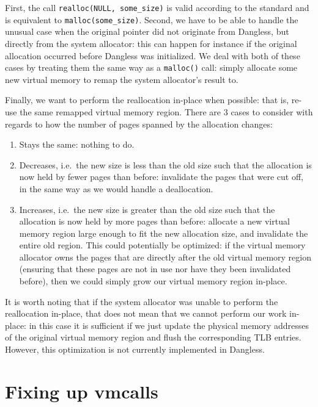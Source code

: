 First, the call \lstinline!realloc(NULL, some_size)! is valid according to the standard and is equivalent to \lstinline!malloc(some_size)!. Second, we have to be able to handle the unusual case when the original pointer did not originate from Dangless, but directly from the system allocator: this can happen for instance if the original allocation occurred before Dangless was initialized. We deal with both of these cases by treating them the same way as a \lstinline!malloc()! call: simply allocate some new virtual memory to remap the system allocator's result to.

Finally, we want to perform the reallocation in-place when possible: that is, re-use the same remapped virtual memory region. There are 3 cases to consider with regards to how the number of pages spanned by the allocation changes:

\begin{enumerate}
	\item Stays the same: nothing to do.
	\item Decreases, i.e.\ the new size is less than the old size such that the allocation is now held by fewer pages than before: invalidate the pages that were cut off, in the same way as we would handle a deallocation.
	\item Increases, i.e.\ the new size is greater than the old size such that the allocation is now held by more pages than before: allocate a new virtual memory region large enough to fit the new allocation size, and invalidate the entire old region. This could potentially be optimized: if the virtual memory allocator owns the pages that are directly after the old virtual memory region (ensuring that these pages are not in use nor have they been invalidated before), then we could simply grow our virtual memory region in-place.
\end{enumerate}

It is worth noting that if the system allocator was unable to perform the reallocation in-place, that does not mean that we cannot perform our work in-place: in this case it is sufficient if we just update the physical memory addresses of the original virtual memory region and flush the corresponding TLB entries. However, this optimization is not currently implemented in Dangless.

\section{Fixing up vmcalls}
\label{sec:vmcall-pointer-rewriting}

